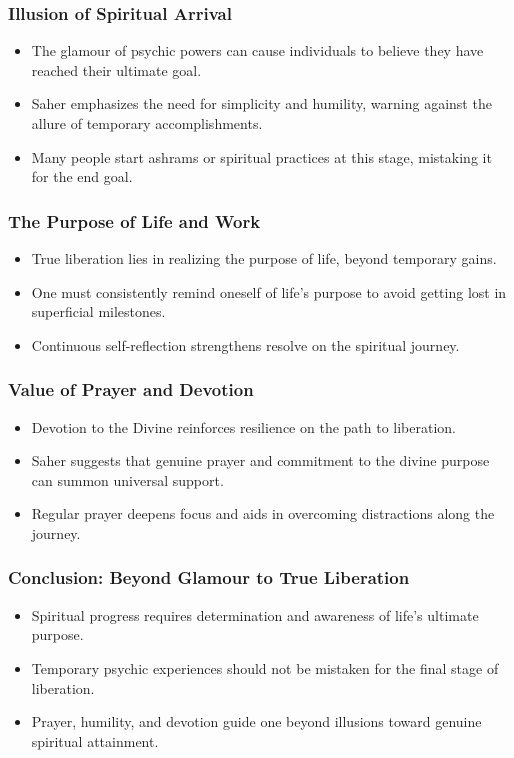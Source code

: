 \begin{frame}[fragile]\frametitle{Illusion of Spiritual Arrival}
    \begin{itemize}
        \item The glamour of psychic powers can cause individuals to believe they have reached their ultimate goal.
        \item Saher emphasizes the need for simplicity and humility, warning against the allure of temporary accomplishments.
        \item Many people start ashrams or spiritual practices at this stage, mistaking it for the end goal.
    \end{itemize}
\end{frame}

\begin{frame}[fragile]\frametitle{The Purpose of Life and Work}
    \begin{itemize}
        \item True liberation lies in realizing the purpose of life, beyond temporary gains.
        \item One must consistently remind oneself of life’s purpose to avoid getting lost in superficial milestones.
        \item Continuous self-reflection strengthens resolve on the spiritual journey.
    \end{itemize}
\end{frame}

\begin{frame}[fragile]\frametitle{Value of Prayer and Devotion}
    \begin{itemize}
        \item Devotion to the Divine reinforces resilience on the path to liberation.
        \item Saher suggests that genuine prayer and commitment to the divine purpose can summon universal support.
        \item Regular prayer deepens focus and aids in overcoming distractions along the journey.
    \end{itemize}
\end{frame}

\begin{frame}[fragile]\frametitle{Conclusion: Beyond Glamour to True Liberation}
    \begin{itemize}
        \item Spiritual progress requires determination and awareness of life’s ultimate purpose.
        \item Temporary psychic experiences should not be mistaken for the final stage of liberation.
        \item Prayer, humility, and devotion guide one beyond illusions toward genuine spiritual attainment.
    \end{itemize}
\end{frame}




